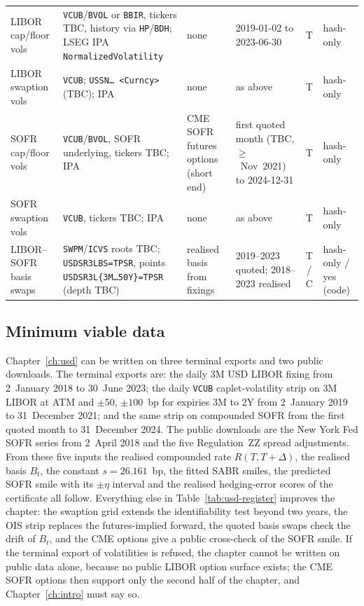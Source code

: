 \begin{table}[htbp]
\begin{tabular}{@{}p{2.4cm}p{3.0cm}p{2.3cm}p{2.1cm}cp{1.6cm}@{}}
LIBOR cap/floor vols & \texttt{VCUB}/\texttt{BVOL} or \texttt{BBIR}, tickers TBC, history via \texttt{HP}/\texttt{BDH}; LSEG IPA \texttt{NormalizedVolatility} & none & 2019-01-02 to 2023-06-30 & T & hash-only \\
LIBOR swaption vols & \texttt{VCUB}; \texttt{USSN\ldots\ <Curncy>} (TBC); IPA & none & as above & T & hash-only \\
SOFR cap/floor vols & \texttt{VCUB}/\texttt{BVOL}, SOFR underlying, tickers TBC; IPA & CME SOFR futures options (short end) & first quoted month (TBC, $\ge$~Nov~2021) to 2024-12-31 & T & hash-only \\
SOFR swaption vols & \texttt{VCUB}, tickers TBC; IPA & none & as above & T & hash-only \\
LIBOR--SOFR basis swaps & \texttt{SWPM}/\texttt{ICVS} roots TBC; \texttt{USDSR3LBS=TPSR}, points \texttt{USDSR3L\{3M\ldots50Y\}=TPSR} (depth TBC) & realised basis from fixings & 2019--2023 quoted; 2018--2023 realised & T / C & hash-only / yes (code) \\
\bottomrule
\end{tabular}
\end{table}

\subsection{Minimum viable data}\label{appC:usd-minimum}

Chapter~\ref{ch:usd} can be written on three terminal exports and two public downloads. The terminal exports are: the daily 3M USD LIBOR fixing from 2~January 2018 to 30~June 2023; the daily \texttt{VCUB} caplet-volatility strip on 3M LIBOR at ATM and $\pm50$, $\pm100$~bp for expiries 3M to 2Y from 2~January 2019 to 31~December 2021; and the same strip on compounded SOFR from the first quoted month to 31~December 2024. The public downloads are the New York Fed SOFR series from 2~April 2018 and the five Regulation~ZZ spread adjustments. From these five inputs the realised compounded rate $R(T,T+\Delta)$, the realised basis $B_t$, the constant $s=26.161$~bp, the fitted SABR smiles, the predicted SOFR smile with its $\pm\eta$ interval and the realised hedging-error scores of the certificate all follow. Everything else in Table~\ref{tab:usd-register} improves the chapter: the swaption grid extends the identifiability test beyond two years, the OIS strip replaces the futures-implied forward, the quoted basis swaps check the drift of $B_t$, and the CME options give a public cross-check of the SOFR smile. If the terminal export of volatilities is refused, the chapter cannot be written on public data alone, because no public LIBOR option surface exists; the CME SOFR options then support only the second half of the chapter, and Chapter~\ref{ch:intro} must say so.

